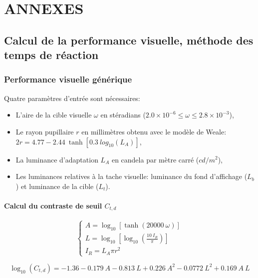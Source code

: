 \part*{ANNEXES}
\newpage

	\chapter*{Calcul de la performance visuelle, méthode des temps de réaction}
	
	\section*{Performance visuelle générique}
	\par Quatre paramètres d'entrée sont nécessaires:
	\begin{itemize}
		\item L'aire de la cible visuelle $\omega$ en stéradians ($2.0 \times 10^{-6} \leq \omega \leq 2.8 \times 10^{-3}$),
		\item Le rayon pupillaire $r$ en millimètres obtenu avec le modèle de Weale: $2r = 4.77 - 2.44~\tanh[0.3~log_{10}(L_A)]$,
		\item La luminance d'adaptation $L_A$ en candela par mètre carré ($cd/m^2$),
		\item Les luminances relatives à la tache visuelle: luminance du fond d'affichage ($L_b$) et luminance de la cible ($L_t$).
	\end{itemize}	
	
	\subsection*{Calcul du contraste de seuil $C_{t,d}$}		
	\begin{equation}
		\begin{cases}
			A = \log_{10} \left[ \tanh(20000~\omega) \right]\\
			L = \log_{10} \left[ \log_{10} \left( \frac{10~I_R}{\pi} \right) \right]\\
			I_R = L_A \pi r^2
		\end{cases}
		\label{eq:anxe_step_10}
	\end{equation}
	
	\begin{equation}
		\log_{10}(C_{t,d}) = -1.36 -0.179~A - 0.813~L + 0.226~A^2 - 0.0772~L^2 + 0.169~A~L
		\label{eq:anxe_step_11}
	\end{equation}
	
